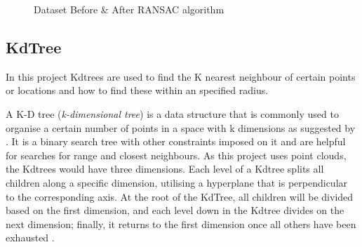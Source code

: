 \documentclass[12pt]{report}
\begin{document}
\begin{figure}[H]%
  \centering
  \qquad
  \caption{Dataset Before \& After RANSAC algorithm }%
  \label{fig:example}%
\end{figure}






\subsection {KdTree}
\label{section:KdTree}
In this project Kdtrees are used to find the K nearest neighbour of certain points or locations and how to find these within an specified radius.

A K-D tree (\textit{k-dimensional tree}) is a data structure that is commonly used to organise a certain number of points in a space with k dimensions as suggested by .
It is a binary search tree with other constraints imposed on it and are helpful for searches for range and closest neighbours.
As this project uses point clouds, the Kdtrees would have three dimensions. Each level of a Kdtree splits all children along a specific dimension, utilising a hyperplane that is perpendicular to the corresponding axis. 
At the root of the KdTree, all children will be divided based on the first dimension, and each level down in the Kdtree divides on the next dimension; finally, it returns to the first dimension once 
all others have been exhausted .
\end{document}

